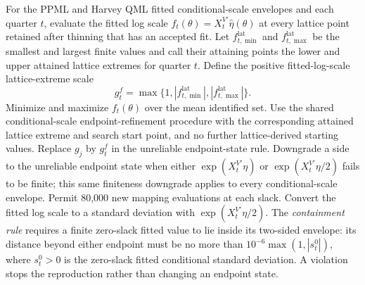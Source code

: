 \documentclass[11pt]{article}
\begin{document}
For the PPML and Harvey QML fitted conditional-scale envelopes and each quarter \(t\), evaluate the fitted log scale
\(f_t(\theta)=X_t^{V\prime}\widehat\eta(\theta)\) at every lattice point retained after thinning that
has an accepted fit. Let \(f_{t,\min}^{\mathrm{lat}}\) and \(f_{t,\max}^{\mathrm{lat}}\) be the
smallest and largest finite values and call their attaining points the lower and upper attained
lattice extremes for quarter \(t\). Define the positive fitted-log-scale lattice-extreme scale
\begin{equation*}
 g_t^f=\max\{1,|f_{t,\min}^{\mathrm{lat}}|,|f_{t,\max}^{\mathrm{lat}}|\}.
\end{equation*}
Minimize and maximize \(f_t(\theta)\) over the mean identified set. Use the shared conditional-scale
endpoint-refinement procedure with the corresponding attained lattice extreme and search start point, and no
further lattice-derived starting values. Replace \(g_j\) by \(g_t^f\) in the
unreliable endpoint-state rule. Downgrade a side to the unreliable endpoint state when either
\(\exp(X_t^{V\prime}\eta)\) or \(\exp(X_t^{V\prime}\eta/2)\) fails to be finite; this same
finiteness downgrade applies to every conditional-scale envelope.
Permit 80,000 new mapping evaluations at each slack. Convert the fitted log scale to a standard deviation with
\(\exp(X_t^{V\prime}\eta/2)\). The \emph{containment rule} requires a finite zero-slack fitted value
to lie inside its two-sided envelope: its
distance beyond either endpoint must be no more than \(10^{-6}\max(1,|s_t^0|)\), where \(s_t^0>0\) is
the zero-slack fitted conditional standard deviation. A violation stops the reproduction rather than changing an endpoint
state.
\end{document}
